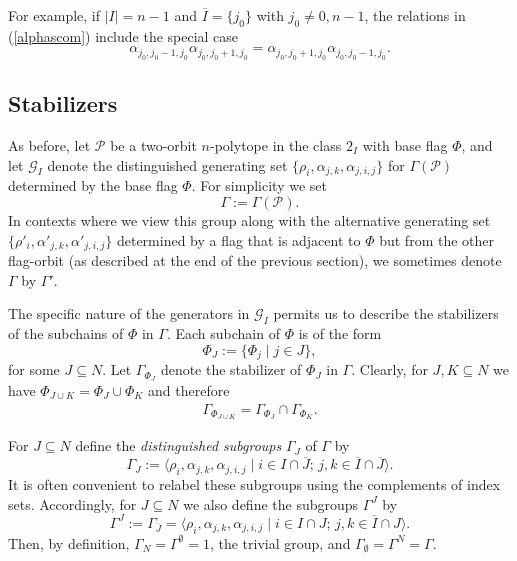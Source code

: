 \documentclass[12pt]{article}
\renewcommand{\bar}{\overline}
\renewcommand{\>}{\rangle}
\theoremstyle{definition}\newtheorem{definition}{Definition}[section]
\begin{document}
For example, if $|I|=n-1$ and $\bar{I}=\{j_0\}$ with $j_{0}\neq 0,n-1$, the relations in (\ref{alphascom}) include the special case 
\begin{equation}
\label{alphaj0com}
\alpha_{j_0,j_{0}-1,j_0}\alpha_{j_0,j_{0}+1,j_0} = \alpha_{j_0,j_{0}+1,j_0}\alpha_{j_0,j_{0}-1,j_0} .
\end{equation}


\subsection{Stabilizers}
\label{stabsection}

As before, let $\mathcal{P}$ be a two-orbit $n$-polytope in the class $2_I$ with base flag $\Phi$, and let $\mathcal{G}_{I}$ denote the distinguished generating set $\{\rho_{i},\alpha_{j,k},\alpha_{j,i,j}\}$ for $\Gamma(\mathcal{P})$ determined by the base flag $\Phi$. For simplicity we set 
\[\Gamma:=\Gamma(\mathcal{P}).\] 
In contexts where we view this group along with the alternative generating set $\{\rho'_{i},\alpha'_{j,k},\alpha'_{j,i,j}\}$ determined by a flag that is adjacent to $\Phi$ but from the other flag-orbit (as described at the end of the previous section), we sometimes denote $\Gamma$ by $\Gamma'$.
\smallskip

The specific nature of the generators in $\mathcal{G}_{I}$ permits us to describe the stabilizers of the subchains of $\Phi$ in $\Gamma$. Each subchain of $\Phi$ is of the form 
\[\Phi_J := \{ \Phi_j \mid j \in J \},\]
for some $J \subseteq N$. Let $\Gamma_{\Phi_J}$ denote the stabilizer of $\Phi_J$ in $\Gamma$. Clearly, for $J, K \subseteq N$ we have $\Phi_{J \cup K}=\Phi_J \cup \Phi_K$ and therefore
\begin{eqnarray}
\label{intersection1}
\Gamma_{\Phi_{J \cup K}} = \Gamma_{\Phi_J} \cap \Gamma_{\Phi_K}.
\end{eqnarray}

For $J \subseteq N$ define the {\it distinguished subgroups} $\Gamma_J$ of $\Gamma$ by 
\begin{equation}
\label{gamJ}
\Gamma_J:=\langle \rho_i, \alpha_{j,k},  \alpha_{j,i,j} \mid i \in I \cap \bar{J}; \, j,k \in \bar{I} \cap \bar{J} \rangle.
\end{equation} 
It is often convenient to relabel these subgroups using the complements of index sets. Accordingly, for $J \subseteq N$ we also define the subgroups $\Gamma^J$ by 
\begin{equation}
\label{gamJbar}
\Gamma^{J}:= \Gamma_{\bar{J}} = \langle \rho_i, \alpha_{j,k}, \alpha_{j,i,j} \mid i \in I \cap J; \, j,k \in \bar{I} \cap J \rangle.
\end{equation} 
Then, by definition, $\Gamma_N=\Gamma^{\emptyset}=1$, the trivial group, and $\Gamma_{\emptyset}=\Gamma^N=\Gamma$. 
\smallskip
\end{document}
